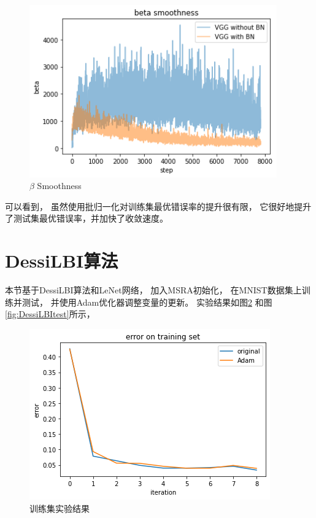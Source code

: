 \documentclass{article}
\begin{document}
\begin{figure}[h]
\centering
\includegraphics[width=0.95\textwidth]
{Result/Beta Smoothness.png}
\caption{$\beta$ Smoothness}
\label{fig:VGGBS}
\end{figure}

可以看到，
虽然使用批归一化对训练集最优错误率的提升很有限，
它很好地提升了测试集最优错误率，并加快了收敛速度。

\section{DessiLBI算法}

本节基于DessiLBI算法和LeNet网络，
加入MSRA初始化，
在MNIST数据集上训练并测试，
并使用Adam优化器调整变量的更新。
实验结果如图\ref{fig:DessiLBItrain}
和图\ref{fig:DessiLBItest}所示，

\begin{figure}[h]
\includegraphics[width=\textwidth]
{Result/DessiLBI LeNet Adam/figure.png}
\caption{训练集实验结果}
\label{fig:DessiLBItrain}
\end{figure}
\end{document}
